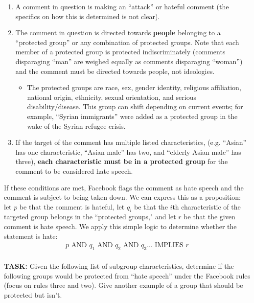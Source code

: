 \documentclass[12pt,letterpaper]{article}
\begin{document}
     \begin{enumerate}[1.]
        \item A comment in question is making an “attack” or hateful comment (the specifics on how this is determined is not clear).
        \item The comment in question is directed towards \textbf{people} belonging to a “protected group” or any combination of protected groups. Note that each member of a protected group is protected indiscriminately (comments disparaging “man” are weighed equally as comments disparaging “woman”) and the comment must be directed towards people, not ideologies.
        	\begin{itemize}
                \item The protected groups are race, sex, gender identity, religious affiliation, national origin, ethnicity, sexual orientation, and serious disability/disease. This group can shift depending on current events; for example, “Syrian immigrants” were added as a protected group in the wake of the Syrian refugee crisis.
        	\end{itemize}
        \item If the target of the comment has multiple listed characteristics, (e.g. “Asian” has one characteristic, “Asian male” has two, and “elderly Asian male” has three), \textbf{each characteristic must be in a protected group} for the comment to be considered hate speech.
    \end{enumerate}
    
    If these conditions are met, Facebook flags the comment as hate speech and the comment is subject to being taken down. We can express this as a proposition: let $p$ be that the comment is hateful, let $q_i$ be that the $i$th characteristic of the targeted group belongs in the “protected groups," and let $r$ be that the given comment is hate speech. We apply this simple logic to determine whether the statement is hate:
    \begin {align*}
    	p \text{ AND } q_1 \text{ AND } q_2 \text{ AND } q_3 … \text{ IMPLIES } r \\
    \end {align*}
    
    \newpage 
    \textbf{TASK:} Given the following list of subgroup characteristics, determine if the following groups would be protected from “hate speech” under the Facebook rules (focus on rules three and two). Give another example of a group that should be protected but isn’t.
    
\end{document}
